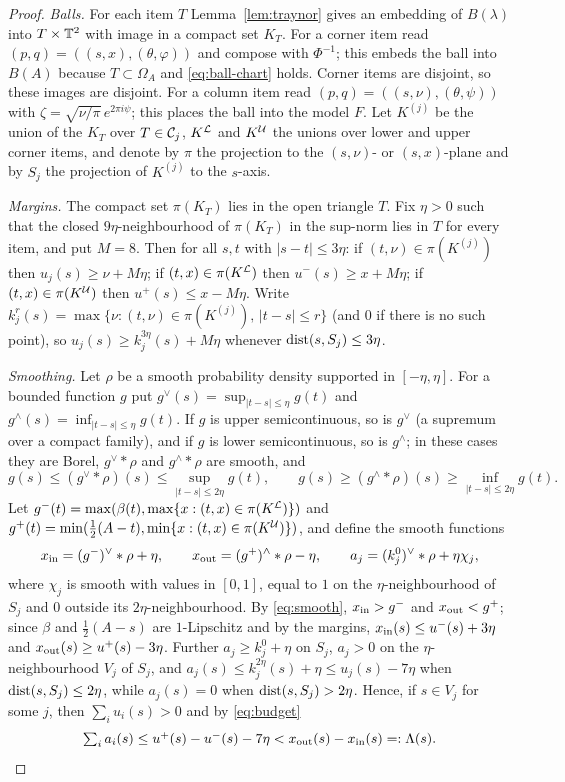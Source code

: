 \documentclass[11pt]{amsart}
\begin{document}
\begin{proof}
\emph{Balls.} For each item $T$ Lemma~\ref{lem:traynor} gives an embedding of $B(\lambda)$ into $T\times\mathbb{T}^2$ with
image in a compact set $K_T$. For a corner item read $(p,q)=((s,x),(\theta,\varphi))$ and compose with $\Phi^{-1}$;
this embeds the ball into $B(A)$ because $T\subset\Omega_A$ and \eqref{eq:ball-chart} holds. Corner items are
disjoint, so these images are disjoint. For a column item read $(p,q)=((s,\nu),(\theta,\psi))$ with
$\zeta=\sqrt{\nu/\pi}\,e^{2\pi i\psi}$; this places the ball into the model $F$. Let $K^{(j)}$ be the union of the
$K_T$ over $T\in\mathcal{C}_j$, $K^{\mathcal{L}}$ and $K^{\mathcal{U}}$ the unions over lower and upper corner items, and denote by $\pi$
the projection to the $(s,\nu)$- or $(s,x)$-plane and by $S_j$ the projection of $K^{(j)}$ to the $s$-axis.

\emph{Margins.} The compact set $\pi(K_T)$ lies in the open triangle $T$. Fix $\eta>0$ such that the closed
$9\eta$-neighbourhood of $\pi(K_T)$ in the sup-norm lies in $T$ for every item, and put $M=8$. Then for all
$s,t$ with $|s-t|\le3\eta$: if $(t,\nu)\in\pi(K^{(j)})$ then $u_j(s)\ge\nu+M\eta$; if $(t,x)\in\pi(K^{\mathcal{L}})$ then
$u^-(s)\ge x+M\eta$; if $(t,x)\in\pi(K^{\mathcal{U}})$ then $u^+(s)\le x-M\eta$. Write
$k_j^r(s)=\max\{\nu:(t,\nu)\in\pi(K^{(j)}),\,|t-s|\le r\}$ (and $0$ if there is no such point), so
$u_j(s)\ge k_j^{3\eta}(s)+M\eta$ whenever $\operatorname{dist}(s,S_j)\le3\eta$.

\emph{Smoothing.} Let $\rho$ be a smooth probability density supported in $[-\eta,\eta]$. For a bounded function
$g$ put $g^{\vee}(s)=\sup_{|t-s|\le\eta}g(t)$ and $g^{\wedge}(s)=\inf_{|t-s|\le\eta}g(t)$. If $g$ is upper
semicontinuous, so is $g^\vee$ (a supremum over a compact family), and if $g$ is lower semicontinuous, so is
$g^\wedge$; in these cases they are Borel, $g^\vee*\rho$ and $g^\wedge*\rho$ are smooth, and
\begin{equation}\label{eq:smooth}
g(s)\le(g^\vee*\rho)(s)\le\sup_{|t-s|\le2\eta}g(t),\qquad
g(s)\ge(g^\wedge*\rho)(s)\ge\inf_{|t-s|\le2\eta}g(t).
\end{equation}
Let $g^-(t)=\max(\beta(t),\max\{x:(t,x)\in\pi(K^{\mathcal{L}})\})$ and $g^+(t)=\min(\frac12(A-t),\min\{x:(t,x)\in\pi(K^{\mathcal{U}})\})$,
and define the smooth functions
\[
x_{\rm in}=(g^-)^\vee*\rho+\eta,\qquad x_{\rm out}=(g^+)^\wedge*\rho-\eta,\qquad
a_j=(k_j^0)^\vee*\rho+\eta\chi_j,
\]
where $\chi_j$ is smooth with values in $[0,1]$, equal to $1$ on the $\eta$-neighbourhood of $S_j$ and $0$ outside
its $2\eta$-neighbourhood. By \eqref{eq:smooth}, $x_{\rm in}>g^-$ and $x_{\rm out}<g^+$; since $\beta$ and
$\frac12(A-s)$ are $1$-Lipschitz and by the margins, $x_{\rm in}(s)\le u^-(s)+3\eta$ and
$x_{\rm out}(s)\ge u^+(s)-3\eta$. Further $a_j\ge k_j^0+\eta$ on $S_j$, $a_j>0$ on the $\eta$-neighbourhood
$V_j$ of $S_j$, and $a_j(s)\le k_j^{2\eta}(s)+\eta\le u_j(s)-7\eta$ when $\operatorname{dist}(s,S_j)\le2\eta$, while $a_j(s)=0$
when $\operatorname{dist}(s,S_j)>2\eta$. Hence, if $s\in V_j$ for some $j$, then $\sum_iu_i(s)>0$ and by \eqref{eq:budget}
\begin{equation}\label{eq:fits}
\textstyle\sum_i a_i(s)\le u^+(s)-u^-(s)-7\eta< x_{\rm out}(s)-x_{\rm in}(s)=:\Lambda(s).
\end{equation}


\end{proof}
\end{document}
